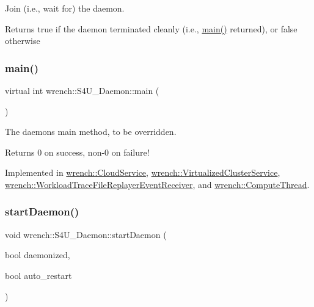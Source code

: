 Join (i.\+e., wait for) the daemon. 

\begin{DoxyReturn}{Returns}
true if the daemon terminated cleanly (i.\+e., \hyperlink{classwrench_1_1_s4_u___daemon_a0073b1104849679756809330533400eb}{main()} returned), or false otherwise 
\end{DoxyReturn}
\mbox{\label{classwrench_1_1_s4_u___daemon_a0073b1104849679756809330533400eb}} 
\subsubsection{\texorpdfstring{main()}{main()}}
{\footnotesize\ttfamily virtual int wrench\+::\+S4\+U\+\_\+\+Daemon\+::main (\begin{DoxyParamCaption}{ }\end{DoxyParamCaption})\hspace{0.3cm}{\ttfamily [pure virtual]}}



The daemon\textquotesingle{}s main method, to be overridden. 

\begin{DoxyReturn}{Returns}
0 on success, non-\/0 on failure! 
\end{DoxyReturn}


Implemented in \hyperlink{classwrench_1_1_cloud_service_a95f0cc4adf4ad0d33cb757f24b78e9ff}{wrench\+::\+Cloud\+Service}, \hyperlink{classwrench_1_1_virtualized_cluster_service_aa900061ac9077df089dfe760c921ec27}{wrench\+::\+Virtualized\+Cluster\+Service}, \hyperlink{classwrench_1_1_workload_trace_file_replayer_event_receiver_af8ddb6f527d5f49a8b67bcc8a184c628}{wrench\+::\+Workload\+Trace\+File\+Replayer\+Event\+Receiver}, and \hyperlink{classwrench_1_1_compute_thread_aae43a83a656caf607342b248ee5cde2a}{wrench\+::\+Compute\+Thread}.

\mbox{\label{classwrench_1_1_s4_u___daemon_a0c4d09ad3e03735a5de6557c5f995ea2}} 
\subsubsection{\texorpdfstring{start\+Daemon()}{startDaemon()}}
{\footnotesize\ttfamily void wrench\+::\+S4\+U\+\_\+\+Daemon\+::start\+Daemon (\begin{DoxyParamCaption}\item[{bool}]{daemonized,  }\item[{bool}]{auto\+\_\+restart }\end{DoxyParamCaption})}



